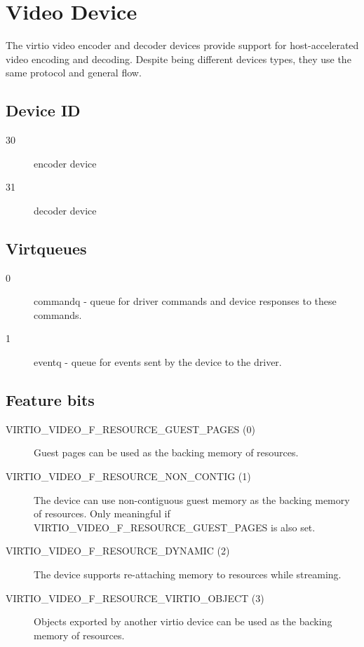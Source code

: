 \section{Video Device}\label{sec:Device Types / Video Device}

The virtio video encoder and decoder devices provide support for
host-accelerated video encoding and decoding. Despite being different
devices types, they use the same protocol and general flow.

\subsection{Device ID}\label{sec:Device Types / Video Device / Device ID}

\begin{description}
\item[30]
encoder device
\item[31]
decoder device
\end{description}

\subsection{Virtqueues}\label{sec:Device Types / Video Device / Virtqueues}

\begin{description}
\item[0]
commandq - queue for driver commands and device responses to these
commands.
\item[1]
eventq - queue for events sent by the device to the driver.
\end{description}

\subsection{Feature bits}\label{sec:Device Types / Video Device / Feature bits}

\begin{description}
\item[VIRTIO\_VIDEO\_F\_RESOURCE\_GUEST\_PAGES (0)]
Guest pages can be used as the backing memory of resources.
\item[VIRTIO\_VIDEO\_F\_RESOURCE\_NON\_CONTIG (1)]
The device can use non-contiguous guest memory as the backing memory of
resources. Only meaningful if VIRTIO\_VIDEO\_F\_RESOURCE\_GUEST\_PAGES
is also set.
\item[VIRTIO\_VIDEO\_F\_RESOURCE\_DYNAMIC (2)]
The device supports re-attaching memory to resources while streaming.
\item[VIRTIO\_VIDEO\_F\_RESOURCE\_VIRTIO\_OBJECT (3)]
Objects exported by another virtio device can be used as the backing
memory of resources.
\end{description}

